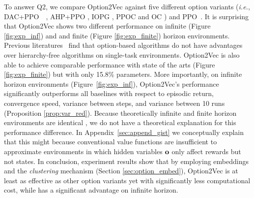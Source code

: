 \documentclass{article}
\begin{document}
To answer Q2, we compare Option2Vec against five different option variants (\textit{i.e.}, DAC+PPO~~\cite{zhang2019dac}, AHP+PPO
\cite{levy2011unified}, IOPG \cite{smith2018inference}, PPOC
\cite{klissarov2017learnings} and OC \cite{bacon2017option}) and PPO~\cite{schulman2017proximal}. It is surprising that Option2Vec shows two different
performance on infinite (Figure \ref{fig:exp_inf}) and and finite
(Figure \ref{fig:exp_finite}) horizon environments. Previous
literatures~\cite{klissarov2017learnings,smith2018inference,harb2018waiting,zhang2019dac}
find that option-based algorithms do not have advantages over
hierarchy-free algorithms on single-task environments. Option2Vec
is also able to achieve comparable performance with state of the arts (Figure
\ref{fig:exp_finite}) but with only 15.8\% parameters.
More importantly, on infinite horizon environments
(Figure~\ref{fig:exp_inf}), Option2Vec's performance
significantly outperforms all baselines with respect to episodic
return, convergence speed, variance between steps, and variance
between 10 runs (Proposition \ref{prop:var_red}). Because
theoretically infinite and finite horizon environments are
identical \cite{sutton2018reinforcement}, we do not have a
theoretical explanation for this performance difference. In
Appendix~\ref{sec:append_gist} we conceptually explain that this
might because conventional value functions are insufficient to
approximate environments in which hidden variables ${\mathbf{o}}$ only
affect rewards but not states. In conclusion, experiment
results show that by employing embeddings and the
\emph{clustering} mechanism (Section \ref{sec:option_embed}),
Option2Vec is at least as effective as other option variants yet
with significantly less computational cost, while has a
significant advantage on infinite horizon.
\end{document}

